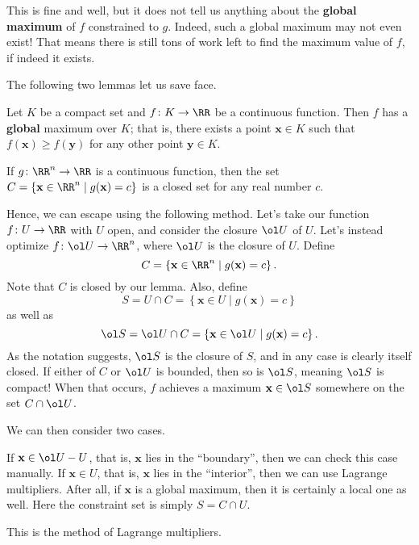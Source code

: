 \documentclass[11pt]{scrartcl}
\begin{document}
This is fine and well, but it does not tell us anything
about the \textbf{global maximum} of $f$ constrained to $g$.
Indeed, such a global maximum may not even exist!
That means there is still tons of work left to
find the maximum value of $f$, if indeed it exists.

The following two lemmas let us save face.
\begin{lemma}
  Let $K$ be a compact set and $f \colon K \to \RR$ be a continuous function.
  Then $f$ has a \textbf{global} maximum over $K$; that is,
  there exists a point $\mathbf{x} \in K$ such that $f(\mathbf{x}) \ge f(\mathbf{y})$
  for any other point $\mathbf{y} \in K$.
\end{lemma}
\begin{lemma}
  If $g \colon \RR^n \to \RR$ is a continuous function, then the set
  $C = \left\{ \mathbf{x} \in \RR^n \mid g(\mathbf{x}) = c \right\}$
  is a closed set for any real number $c$.
\end{lemma}

Hence, we can escape using the following method.
Let's take our function $f \colon U \to \RR$
with $U$ open, and consider the closure $\ol U$ of $U$.
Let's instead optimize $f \colon \ol U \to \RR^n$,
where $\ol U$ is the closure of $U$. Define
\[ C = \left\{ \mathbf{x} \in \RR^n \mid g(\mathbf{x}) = c \right\}. \]
Note that $C$ is closed by our lemma. Also, define
\[ S = U \cap C =
  \left\{ \mathbf{x} \in U \mid g(\mathbf{x}) = c \right\} \]
as well as
\[ \ol S = \ol U \cap C =
  \left\{ \mathbf{x} \in \ol U \mid g(\mathbf{x}) = c \right\}. \]
As the notation suggests, $\ol S$ is the closure of $S$,
and in any case is clearly itself closed.
If either of $C$ or $\ol U$ is bounded,
then so is $\ol S$, meaning $\ol S$ is compact!
When that occurs, $f$ achieves a maximum $\mathbf{x} \in \ol S$
somewhere on the set $C \cap \ol U$.

We can then consider two cases.
\begin{itemize}
  \ii If $\mathbf{x} \in \ol U - U$, that is, $\mathbf{x}$ lies in the ``boundary'',
  then we can check this case manually.
  \ii If $\mathbf{x} \in U$, that is, $\mathbf{x}$ lies in the ``interior'',
  then we can use Lagrange multipliers.
  After all, if $\mathbf{x}$ is a global maximum, then it is certainly a local one as well.
  Here the constraint set is simply $S = C \cap U$.
\end{itemize}

This is the method of Lagrange multipliers.
\end{document}
